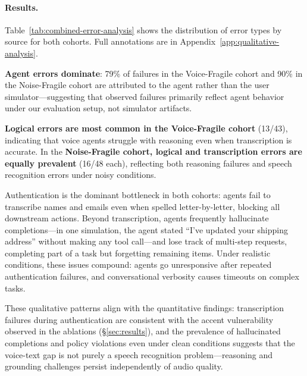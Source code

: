 \paragraph{Results.} Table~\ref{tab:combined-error-analysis} shows the distribution of error types by source for both cohorts. Full annotations are in Appendix~\ref{app:qualitative-analysis}.

\begin{table}[h]
\caption{Error analysis: distribution of error types by source. Agent errors dominate in both cohorts (79\% and 90\%).}
\label{tab:combined-error-analysis}
\centering
\begin{small}
\resizebox{0.85\columnwidth}{!}{%

}
\end{small}
\end{table}

\textbf{Agent errors dominate}: 79\% of failures in the Voice-Fragile cohort and 90\% in the Noise-Fragile cohort are attributed to the agent rather than the user simulator---suggesting that observed failures primarily reflect agent behavior under our evaluation setup, not simulator artifacts.

\textbf{Logical errors are most common in the Voice-Fragile cohort} (13/43), indicating that voice agents struggle with reasoning even when transcription is accurate. In the \textbf{Noise-Fragile cohort, logical and transcription errors are equally prevalent} (16/48 each), reflecting both reasoning failures and speech recognition errors under noisy conditions.

Authentication is the dominant bottleneck in both cohorts: agents fail to transcribe names and emails even when spelled letter-by-letter, blocking all downstream actions. Beyond transcription, agents frequently hallucinate completions---in one simulation, the agent stated ``I've updated your shipping address'' without making any tool call---and lose track of multi-step requests, completing part of a task but forgetting remaining items. Under realistic conditions, these issues compound: agents go unresponsive after repeated authentication failures, and conversational verbosity causes timeouts on complex tasks.

These qualitative patterns align with the quantitative findings: transcription failures during authentication are consistent with the accent vulnerability observed in the ablations (\S\ref{sec:results}), and the prevalence of hallucinated completions and policy violations even under clean conditions suggests that the voice-text gap is not purely a speech recognition problem---reasoning and grounding challenges persist independently of audio quality.

